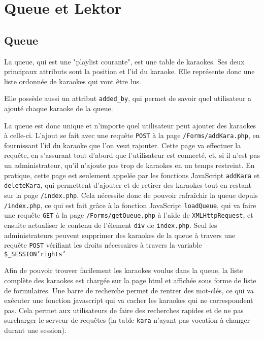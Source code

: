 \section{Queue et Lektor}
\subsection{Queue}

La queue, qui est une "playlist courante", est une table de karaokes. Ses deux principaux attributs sont la position et l'id du karaoke. Elle représente donc une liste ordonnée de karaokes qui vont être lus.

Elle possède aussi un attribut \texttt{added\_by}, qui permet de savoir quel utilisateur a ajouté chaque karaoke de la queue.

La queue est donc unique et n'importe quel utilisateur peut ajouter des karaokes à celle-ci.
L'ajout se fait avec une requête \texttt{POST} à la page \texttt{/Forms/addKara.php}, en fournissant l'id du karaoke que l'on veut rajouter. Cette page va effectuer la requête, en s'assurant tout d'abord que l'utilisateur est connecté, et, si il n'est pas un administrateur, qu'il n'ajoute pas trop de karaokes en un temps restreint.
En pratique, cette page est seulement appelée par les fonctions JavaScript \texttt{addKara} et \texttt{deleteKara}, qui permettent d'ajouter et de retirer des karaokes tout en restant sur la page \texttt{/index.php}.
Cela nécessite donc de pouvoir rafraîchir la queue depuis \texttt{/index.php}, ce qui est fait grâce à la fonction JavaScript \texttt{loadQueue}, qui va faire une requête \texttt{GET} à la page \texttt{/Forms/getQueue.php} à l'aide de \texttt{XMLHttpRequest}, et ensuite actualiser le contenu de l'élement \texttt{div} de \texttt{index.php}.
Seul les administrateurs peuvent supprimer des karaokes de la queue à travers une requête \texttt{POST} vérifiant les droits nécessaires à travers la variable \texttt{\$\_SESSION{\lbrack'rights'\rbrack}} 


Afin de pouvoir trouver facilement les karaokes voulus dans la queue, la liste complète des karaokes est chargée sur la page html et affichée sous forme de liste de formulaires. Une barre de recherche permet de rentrer des mot-clés, ce qui va exécuter une fonction javascript qui va cacher les karaokes qui ne correspondent pas. Cela permet aux utilisateurs de faire des recherches rapides et de ne pas surcharger le serveur de requêtes (la table \texttt{kara} n'ayant pas vocation à changer durant une
session).

